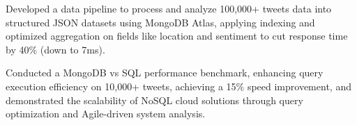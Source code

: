 \vspace{4pt}
\begin{tightemize}
    \item Developed a data pipeline to process and analyze 100,000+ tweets data into structured JSON datasets using MongoDB Atlas, applying indexing and optimized aggregation on fields like location and sentiment to cut response time by 40\% (down to 7ms).
    \item Conducted a MongoDB vs SQL performance benchmark, enhancing query execution efficiency on 10,000+ tweets, achieving a 15\% speed improvement, and demonstrated the scalability of NoSQL cloud solutions through query optimization and Agile-driven system analysis.
\end{tightemize}
